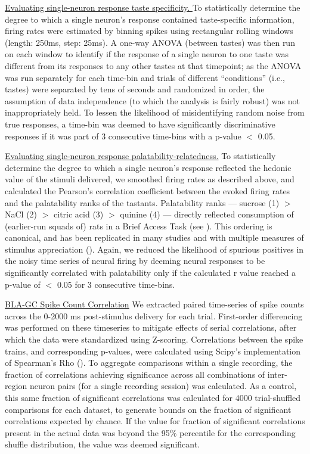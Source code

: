 \begin{refsection}
\noindent\underline{Evaluating single-neuron response taste specificity. }
To statistically determine the degree to which a single neuron’s response contained taste-specific information, firing rates were estimated by binning spikes using rectangular rolling windows (length: 250ms, step: 25ms). A one-way ANOVA (between tastes) was then run on each window to identify if the response of a single neuron to one taste was different from its responses to any other tastes at that timepoint; as the ANOVA was run separately for each time-bin and trials of different “conditions” (i.e., tastes) were separated by tens of seconds and randomized in order, the assumption of data independence (to which the analysis is fairly robust) was not inappropriately held. To lessen the likelihood of misidentifying random noise from true responses, a time-bin was deemed to have significantly discriminative responses if it was part of 3 consecutive time-bins with a p-value \(<\) 0.05.

\noindent\underline{Evaluating single-neuron response palatability-relatedness.} To statistically determine the degree to which a single neuron’s response reflected the hedonic value of the stimuli delivered, we smoothed firing rates as described above, and calculated the Pearson’s correlation coefficient between the evoked firing rates and the palatability ranks of the tastants. Palatability ranks  ---  sucrose (1) \(>\) NaCl (2) \(>\) citric acid (3) \(>\) quinine (4)  ---  directly reflected consumption of (earlier-run squads of) rats in a Brief Access Task (see \cite{sadacca2012a}). This ordering is canonical, and has been replicated in many studies and with multiple measures of stimulus appreciation (\cite{travers1986a,clarke1998a,fontanini2006a}). Again, we reduced the likelihood of spurious positives in the noisy time series of neural firing by deeming neural responses to be significantly correlated with palatability only if the calculated r value reached a p-value of \(<\) 0.05 for 3 consecutive time-bins.

\noindent\underline{BLA-GC Spike Count Correlation}
We extracted paired time-series of spike counts across the 0-2000 ms post-stimulus delivery for each trial. First-order differencing was performed on these timeseries to mitigate effects of serial correlations, after which the data were standardized using Z-scoring. Correlations between the spike trains, and corresponding p-values, were calculated using Scipy’s implementation of Spearman’s Rho (\cite{p2020a}). To aggregate comparisons within a single recording, the fraction of correlations achieving significance across all combinations of inter-region neuron pairs (for a single recording session) was calculated. As a control, this same fraction of significant correlations was calculated for 4000 trial-shuffled comparisons for each dataset, to generate bounds on the fraction of significant correlations expected by chance. If the value for fraction of significant correlations present in the actual data was beyond the 95\% percentile for the corresponding shuffle distribution, the value was deemed significant. 


\end{refsection}
